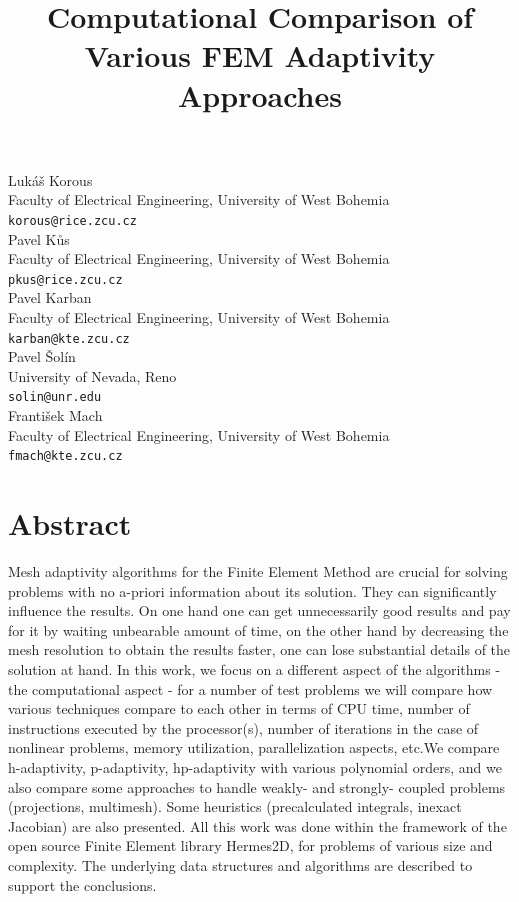 \documentclass[article,A4,11pt]{llncs}%
\begin{document}
\title{Computational Comparison of Various FEM Adaptivity Approaches}
 \author{} \institute{}
\maketitle
\begin{center}
{\large Lukáš Korous}\\
Faculty of Electrical Engineering, University of West Bohemia\\
{\tt korous@rice.zcu.cz}
\\ \vspace{4mm}
{\large Pavel Kůs}\\
Faculty of Electrical Engineering, University of West Bohemia\\
{\tt pkus@rice.zcu.cz}
\\ \vspace{4mm}
{\large Pavel Karban}\\
Faculty of Electrical Engineering, University of West Bohemia\\
{\tt karban@kte.zcu.cz}
\\ \vspace{4mm}
{\large Pavel Šolín}\\
University of Nevada, Reno\\
{\tt solin@unr.edu}
\\ \vspace{4mm}
{\large František Mach}\\
Faculty of Electrical Engineering, University of West Bohemia\\
{\tt fmach@kte.zcu.cz}
\end{center}

\section*{Abstract}
Mesh adaptivity algorithms for the Finite Element Method are crucial for solving problems with no  a-priori information about its solution. They can significantly influence the results. On one hand one can get unnecessarily good results and pay for it by waiting unbearable amount of time, on the other hand by decreasing the mesh resolution to obtain the results faster, one can lose substantial details of the solution at hand. In this work, we focus on a different aspect of the algorithms - the computational aspect - for a number of test problems we will compare how various techniques compare to each other in terms of CPU time, number of instructions executed by the processor(s), number of iterations in the case of nonlinear problems, memory utilization, parallelization aspects, etc.We compare h-adaptivity, p-adaptivity, hp-adaptivity with various polynomial orders, and we also compare some approaches to handle weakly- and strongly- coupled problems (projections, multimesh). Some heuristics (precalculated integrals, inexact Jacobian) are also presented. All this work was done within the framework of the open source Finite Element library Hermes2D, for problems of various size and complexity. The underlying data structures and algorithms are described to support the conclusions.
\end{document}
